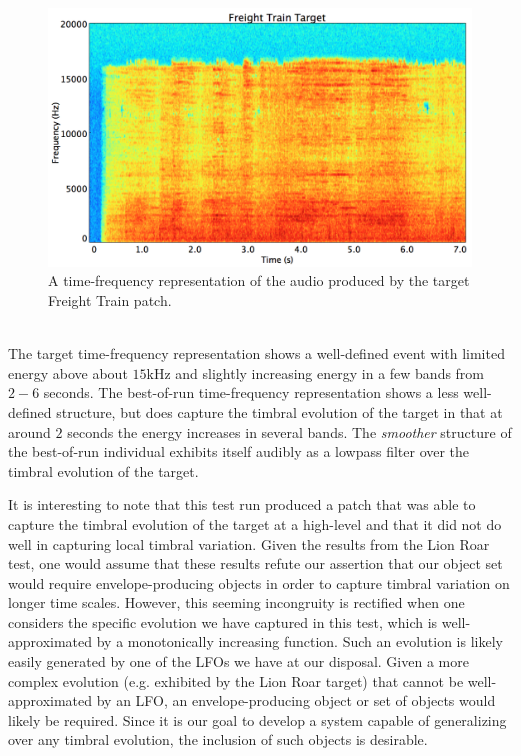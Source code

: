 \documentclass[a4paper,12pt]{report} 	%
\numberwithin{figure}{chapter}
\numberwithin{table}{chapter}
\numberwithin{equation}{chapter}
\begin{document}
\begin{flushleft}
\begin{figure}[h!]
\begin{center}
\includegraphics[scale=0.35,width=\linewidth]{FreightTrainTargetSTFT}
\caption[Target Freight Train Time-Frequency Representation]{A time-frequency representation of the audio produced by the target Freight Train patch.}
\end{center}
\end{figure}
\\
The target time-frequency representation shows a well-defined event with limited energy above about $15$kHz and slightly increasing energy in a few bands from $2-6$ seconds. The best-of-run time-frequency representation shows a less well-defined structure, but does capture the timbral evolution of the target in that at around $2$ seconds the energy increases in several bands. The \emph{smoother} structure of the best-of-run individual exhibits itself audibly as a lowpass filter over the timbral evolution of the target.

It is interesting to note that this test run produced a patch that was able to capture the timbral evolution of the target at a high-level and that it did not do well in capturing local timbral variation. Given the results from the Lion Roar test, one would assume that these results refute our assertion that our object set would require envelope-producing objects in order to capture timbral variation on longer time scales. However, this seeming incongruity is rectified when one considers the specific evolution we have captured in this test, which is well-approximated by a monotonically increasing function. Such an evolution is likely easily generated by one of the LFOs we have at our disposal. Given a more complex evolution (e.g. exhibited by the Lion Roar target) that cannot be well-approximated by an LFO, an envelope-producing object or set of objects would likely be required. Since it is our goal to develop a system capable of generalizing over any timbral evolution, the inclusion of such objects is desirable.


\end{flushleft}
\end{document}
